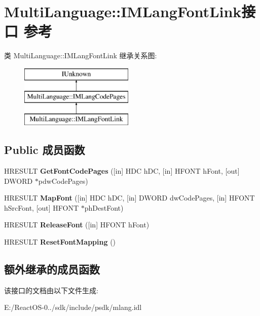 \hypertarget{interface_multi_language_1_1_i_m_lang_font_link}{}\section{Multi\+Language\+:\+:I\+M\+Lang\+Font\+Link接口 参考}
\label{interface_multi_language_1_1_i_m_lang_font_link}
类 Multi\+Language\+:\+:I\+M\+Lang\+Font\+Link 继承关系图\+:\begin{figure}[H]
\begin{center}
\leavevmode
\includegraphics[height=3.000000cm]{interface_multi_language_1_1_i_m_lang_font_link}
\end{center}
\end{figure}
\subsection*{Public 成员函数}
\begin{DoxyCompactItemize}
\item 
\mbox{\label{interface_multi_language_1_1_i_m_lang_font_link_a73acf3e5fa64954f652b779def51a286}} 
H\+R\+E\+S\+U\+LT {\bfseries Get\+Font\+Code\+Pages} (\mbox{[}in\mbox{]} H\+DC h\+DC, \mbox{[}in\mbox{]} H\+F\+O\+NT h\+Font, \mbox{[}out\mbox{]} D\+W\+O\+RD $\ast$pdw\+Code\+Pages)
\item 
\mbox{\label{interface_multi_language_1_1_i_m_lang_font_link_a776e8cb4898a48b13666d3f5a523b506}} 
H\+R\+E\+S\+U\+LT {\bfseries Map\+Font} (\mbox{[}in\mbox{]} H\+DC h\+DC, \mbox{[}in\mbox{]} D\+W\+O\+RD dw\+Code\+Pages, \mbox{[}in\mbox{]} H\+F\+O\+NT h\+Src\+Font, \mbox{[}out\mbox{]} H\+F\+O\+NT $\ast$ph\+Dest\+Font)
\item 
\mbox{\label{interface_multi_language_1_1_i_m_lang_font_link_abee045bceb1d1b820a5820dba84c7bbc}} 
H\+R\+E\+S\+U\+LT {\bfseries Release\+Font} (\mbox{[}in\mbox{]} H\+F\+O\+NT h\+Font)
\item 
\mbox{\label{interface_multi_language_1_1_i_m_lang_font_link_a38afd5d845e55df5e9ec563e84341ac9}} 
H\+R\+E\+S\+U\+LT {\bfseries Reset\+Font\+Mapping} ()
\end{DoxyCompactItemize}
\subsection*{额外继承的成员函数}


该接口的文档由以下文件生成\+:\begin{DoxyCompactItemize}
\item 
E\+:/\+React\+O\+S-\/0../sdk/include/psdk/mlang.\+idl\end{DoxyCompactItemize}
